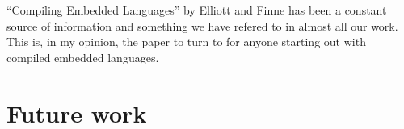 \documentclass[a4paper]{book}
\begin{document}
``Compiling Embedded Languages'' by Elliott and Finne has been a constant source of information 
and something we have refered to in almost all our work. This is, in my opinion, the paper to turn 
to for anyone starting out with compiled embedded languages. 






\FloatBarrier
%
%
\section{Future work} 
\end{document}
